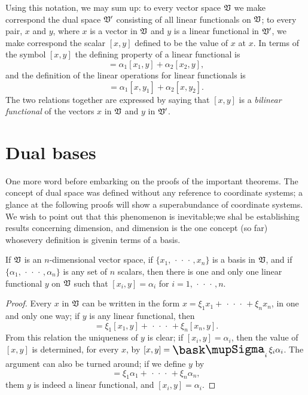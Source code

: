 Using this notation, we may sum up: to every vector space \(\mathfrak{V}\) we make
correspond the dual space \(\mathfrak{V}'\) consisting of all linear functionals on
\(\mathfrak{V}\); to every pair, \(x\) and \(y\), where \(x\) is a vector in
\(\mathfrak{V}\) and \(y\) is a linear functional in \(\mathfrak{V}'\), we make correspond
the scalar \([x,y]\) defined to be the value of \(x\) at \(x\). In terms of the
symbol \([x, y]\) the defining property of a linear functional is
\begin{equation}
    [\alpha_1 x_1 + \alpha_2 x_2, y] = \alpha_1 [x_1, y] + \alpha_2 [x_2, y],
\end{equation}
and the definition of the linear operations for linear functionals is
\begin{equation}
    [x, \alpha_1 y_1 + \alpha_2 y_2] = \alpha_1 [x, y_1] + \alpha_2 [x, y_2].
\end{equation}
The two relations together are expressed by saying that \([x, y]\) is a
\emph{bilinear functional} of the vectors \(x\) in \(\mathfrak{V}\) and \(y\) in
\(\mathfrak{V}'\).

\section{Dual bases}
One more word before embarking on the proofs of the important theorems. The
concept of dual space was defined without any reference to coordinate systems; a
glance at the following proofs will show a superabundance of coordinate systems.
We wish to point out that this phenomenon is inevitable;we shal be establishing
results concerning dimension, and dimension is the one concept (so far)
whosevery definition is givenin terms of a basis.

\begin{theorem}
    If \(\mathfrak{V}\) is an \(n\)-dimensional vector space, if \(\{x_1,
    \,\cdot\,\cdot\,\cdot\,, x_n\}\) is a basis in \(\mathfrak{V}\), and if
    \(\{\alpha_1, \,\cdot\,\cdot\,\cdot\,, \alpha_n\}\) is any set of \(n\)
    scalars, then there is one and only one linear functional \(y\) on
    \(\mathfrak{V}\) such that \([x_i, y] = \alpha_i\) for \(i = 1,
    \,\cdot\,\cdot\,\cdot\,, n\).
\end{theorem}

\begin{proof}
    Every \(x\) in \(\mathfrak{V}\) can be written in the form \(x = \xi_1 x_1 +
    \,\cdot\,\cdot\,\cdot\, + \xi_n x_n\), in one and only one way; if \(y\) is
    any linear functional, then
    \begin{equation*}
        [x, y] = \xi_1 [x_1, y] + \,\cdot\,\cdot\,\cdot\, + \xi_n [x_n, y].
    \end{equation*}
    From this relation the uniqueness of \(y\) is clear; if \([x_i, y] =
    \alpha_i\), then the value of \([x, y]\) is determined, for every \(x\), by
    \([x,y] = \sumx_i \xi_i \alpha_i\). The argument can also be turned around;
    if we define \(y\) by
    \begin{equation*}
        [x,y] = \xi_1 \alpha_1 + \,\cdot\,\cdot\,\cdot\, + \xi_n \alpha_n,
    \end{equation*}
    them \(y\) is indeed a linear functional, and \([x_i, y] = \alpha_i\).
\end{proof}

